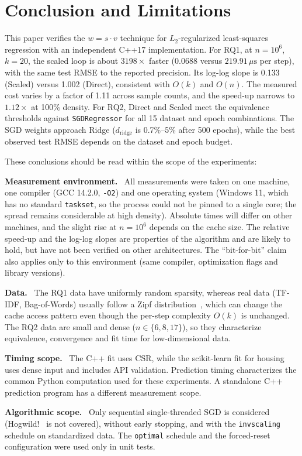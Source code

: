 \documentclass[10pt,a4paper,twocolumn]{article}
\newcommand{\sk}{\texttt{SGDRegressor}}
\newcommand{\x}{\times}
\newcommand{\mus}{\,\mu\mathrm{s}}
\newcommand{\dridge}{d_{\mathrm{ridge}}}
\newcommand{\hd}[1]{\textbf{#1}\ }          %
\begin{document}
\section{Conclusion and Limitations}
This paper verifies the $w=s\cdot v$ technique for $L_2$-regularized least-squares regression with an independent C++17 implementation. For RQ1, at $n=10^6$, $k=20$, the scaled loop is about $3198\x$ faster ($0.0688$ versus $219.91\mus$ per step), with the same test RMSE to the reported precision. Its log-log slope is 0.133 (Scaled) versus 1.002 (Direct), consistent with $O(k)$ and $O(n)$. The measured cost varies by a factor of 1.11 across sample counts, and the speed-up narrows to $1.12\x$ at 100\% density. For RQ2, Direct and Scaled meet the equivalence thresholds against \sk{} for all 15 dataset and epoch combinations. The SGD weights approach Ridge ($\dridge$ is 0.7\%--5\% after 500 epochs), while the best observed test RMSE depends on the dataset and epoch budget.

These conclusions should be read within the scope of the experiments:

\hd{Measurement environment.} All measurements were taken on one machine, one compiler (GCC 14.2.0, \texttt{-O2}) and one operating system (Windows 11, which has no standard \texttt{taskset}, so the process could not be pinned to a single core; the spread remains considerable at high density). Absolute times will differ on other machines, and the slight rise at $n=10^6$ depends on the cache size. The relative speed-up and the log-log slopes are properties of the algorithm and are likely to hold, but have not been verified on other architectures. The ``bit-for-bit'' claim also applies only to this environment (same compiler, optimization flags and library versions).

\hd{Data.} The RQ1 data have uniformly random sparsity, whereas real data (TF-IDF, Bag-of-Words) usually follow a Zipf distribution~\cite{zipf}, which can change the cache access pattern even though the per-step complexity $O(k)$ is unchanged. The RQ2 data are small and dense ($n\in\{6,8,17\}$), so they characterize equivalence, convergence and fit time for low-dimensional data.

\hd{Timing scope.} The C++ fit uses CSR, while the scikit-learn fit for housing uses dense input and includes API validation. Prediction timing characterizes the common Python computation used for these experiments. A standalone C++ prediction program has a different measurement scope.

\hd{Algorithmic scope.} Only sequential single-threaded SGD is considered (Hogwild!~\cite{hogwild} is not covered), without early stopping, and with the \texttt{invscaling} schedule on standardized data. The \texttt{optimal} schedule and the forced-reset configuration were used only in unit tests.
\end{document}
